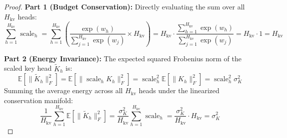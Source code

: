 \documentclass{article}
\begin{document}
\begin{proof}
\textbf{Part 1 (Budget Conservation):}
Directly evaluating the sum over all $H_{\text{kv}}$ heads:
\begin{equation}
    \sum_{h=1}^{H_{\text{kv}}} \operatorname{scale}_h = \sum_{h=1}^{H_{\text{kv}}} \left( \frac{\exp(w_h)}{\sum_{j=1}^{H_{\text{kv}}} \exp(w_j)} \times H_{\text{kv}} \right) = H_{\text{kv}} \cdot \frac{\sum_{h=1}^{H_{\text{kv}}} \exp(w_h)}{\sum_{j=1}^{H_{\text{kv}}} \exp(w_j)} = H_{\text{kv}} \cdot 1 = H_{\text{kv}}
\end{equation}

\textbf{Part 2 (Energy Invariance):}
The expected squared Frobenius norm of the scaled key head $\tilde{K}_h$ is:
\begin{equation}
    \mathbb{E}[\|\tilde{K}_h\|_F^2] = \mathbb{E}[\|\operatorname{scale}_h K_h\|_F^2] = \operatorname{scale}_h^2 \mathbb{E}[\|K_h\|_F^2] = \operatorname{scale}_h^2 \sigma_K^2
\end{equation}
Summing the average energy across all $H_{\text{kv}}$ heads under the linearized conservation manifold:
\begin{equation}
    \frac{1}{H_{\text{kv}}} \sum_{h=1}^{H_{\text{kv}}} \mathbb{E}[\|\tilde{K}_h\|_F^2] = \frac{\sigma_K^2}{H_{\text{kv}}} \sum_{h=1}^{H_{\text{kv}}} \operatorname{scale}_h = \frac{\sigma_K^2}{H_{\text{kv}}} \cdot H_{\text{kv}} = \sigma_K^2
\end{equation}


\end{proof}
\end{document}
